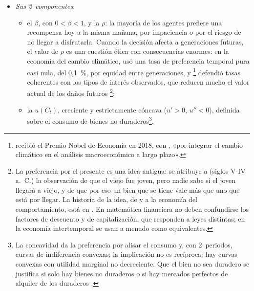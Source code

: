 \documentclass[11pt]{article}
\begin{document}
\begin{itemize}
\begin{figure}[H]
  \caption{Funciones de descuento exponencial, hiperbólica y cuasihiperbólica}\label{fig:descuento}
  \end{figure}
\item \emph{Sus 2~componentes}:
  \begin{itemize}
  \item el  $\beta$, con $0<\beta<1$, y la  $\rho$: la mayoría de los agentes prefiere una recompensa hoy a la misma mañana, por impaciencia o por el riesgo de no llegar a disfrutarla. Cuando la decisión afecta a generaciones futuras, el valor de $\rho$ es una cuestión ética con consecuencias enormes: en la economía del cambio climático, \textcite{Stern2007Economics} usó una tasa de preferencia temporal pura casi nula, del 0,1~\%, por equidad entre generaciones, y \textcite{Nordhaus2007Review}\footnote{ recibió el Premio Nobel de Economía en 2018, con , «por integrar el cambio climático en el análisis macroeconómico a largo plazo»\nocite{Nobel2018Nordhaus}.} defendió tasas coherentes con los tipos de interés observados, que reducen mucho el valor actual de los daños futuros \footnote{La preferencia por el presente es una idea antigua: se atribuye a  (siglos V-IV a.~C.) la observación de que el viejo fue joven, pero nadie sabe si el joven llegará a viejo, y de que por eso un bien que se tiene vale más que uno que está por llegar. La historia de la idea, de  y  a la economía del comportamiento, está en \textcite{FrederickEtAl2002Time}. En matemática financiera no deben confundirse los factores de descuento y de capitalización, que responden a leyes distintas; en la economía intertemporal se usan a menudo como equivalentes.};
  \item la  $u(C_t)$, creciente y estrictamente cóncava ($u'>0$, $u''<0$), definida sobre el consumo de bienes no duraderos\footnote{La concavidad da la preferencia por alisar el consumo y, con 2~periodos, curvas de indiferencia convexas; la implicación no es recíproca: hay curvas convexas con utilidad marginal no decreciente. Que el bien no sea duradero se justifica si solo hay bienes no duraderos o si hay mercados perfectos de alquiler de los duraderos .}.

\end{itemize}
\end{itemize}
\end{document}
